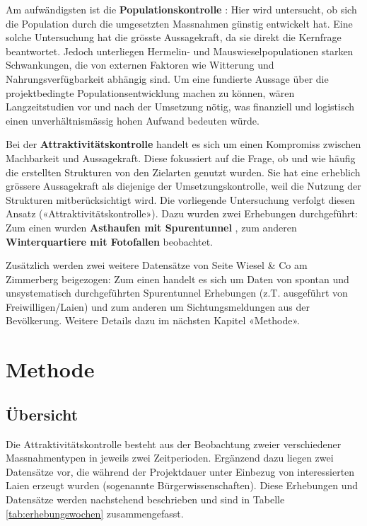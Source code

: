 \documentclass[
]{scrbook}
\begin{document}
Am aufwändigsten ist die \textbf{Populationskontrolle} : Hier wird untersucht, ob sich die Population durch die umgesetzten Massnahmen günstig entwickelt hat. Eine solche Untersuchung hat die grösste Aussagekraft, da sie direkt die Kernfrage beantwortet. Jedoch unterliegen Hermelin- und Mauswieselpopulationen starken Schwankungen, die von externen Faktoren wie Witterung und Nahrungsverfügbarkeit abhängig sind. Um eine fundierte Aussage über die projektbedingte Populationsentwicklung machen zu können, wären Langzeitstudien vor und nach der Umsetzung nötig, was finanziell und logistisch einen unverhältnismässig hohen Aufwand bedeuten würde.

Bei der \textbf{Attraktivitätskontrolle} handelt es sich um einen Kompromiss zwischen Machbarkeit und Aussagekraft. Diese fokussiert auf die Frage, ob und wie häufig die erstellten Strukturen von den Zielarten genutzt wurden. Sie hat eine erheblich grössere Aussagekraft als diejenige der Umsetzungskontrolle, weil die Nutzung der Strukturen mitberücksichtigt wird. Die vorliegende Untersuchung verfolgt diesen Ansatz («Attraktivitätskontrolle»). Dazu wurden zwei Erhebungen durchgeführt: Zum einen wurden \textbf{Asthaufen mit Spurentunnel} , zum anderen \textbf{Winterquartiere mit Fotofallen} beobachtet.

Zusätzlich werden zwei weitere Datensätze von Seite Wiesel \& Co am Zimmerberg beigezogen: Zum einen handelt es sich um Daten von spontan und unsystematisch durchgeführten Spurentunnel Erhebungen (z.T. ausgeführt von Freiwilligen/Laien) und zum anderen um Sichtungsmeldungen aus der Bevölkerung. Weitere Details dazu im nächsten Kapitel «Methode».

\hypertarget{methode}{%
\chapter{Methode}\label{methode}}

\hypertarget{uxfcbersicht}{%
\section{Übersicht}\label{uxfcbersicht}}

Die Attraktivitätskontrolle besteht aus der Beobachtung zweier verschiedener Massnahmentypen in jeweils zwei Zeitperioden. Ergänzend dazu liegen zwei Datensätze vor, die während der Projektdauer unter Einbezug von interessierten Laien erzeugt wurden (sogenannte Bürgerwissenschaften). Diese Erhebungen und Datensätze werden nachstehend beschrieben und sind in Tabelle \ref{tab:erhebungswochen} zusammengefasst.
\end{document}
